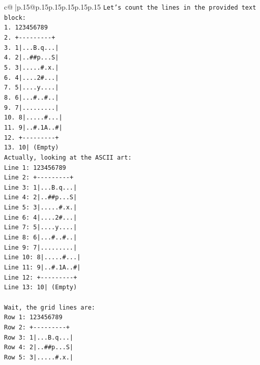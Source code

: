 \documentclass{article}
\begin{document}
{\begin{supertabular}{c@{$\;$}|p{.15\linewidth}@{}p{.15\linewidth}p{.15\linewidth}p{.15\linewidth}p{.15\linewidth}p{.15\linewidth}}
{{{\texttt{Let's count the lines in the provided text block:} \\
\texttt{1. 123456789} \\
\texttt{2. +{-}{-}{-}{-}{-}{-}{-}{-}{-}+} \\
\texttt{3. 1|...B.q...|} \\
\texttt{4. 2|..\#\#p...S|} \\
\texttt{5. 3|.....\#.x.|} \\
\texttt{6. 4|....2\#...|} \\
\texttt{7. 5|....y....|} \\
\texttt{8. 6|...\#..\#..|} \\
\texttt{9. 7|.........|} \\
\texttt{10. 8|.....\#...|} \\
\texttt{11. 9|..\#.1A..\#|} \\
\texttt{12. +{-}{-}{-}{-}{-}{-}{-}{-}{-}+} \\
\texttt{13. 10| (Empty)} \\
\texttt{Actually, looking at the ASCII art:} \\
\texttt{Line 1: 123456789} \\
\texttt{Line 2: +{-}{-}{-}{-}{-}{-}{-}{-}{-}+} \\
\texttt{Line 3: 1|...B.q...|} \\
\texttt{Line 4: 2|..\#\#p...S|} \\
\texttt{Line 5: 3|.....\#.x.|} \\
\texttt{Line 6: 4|....2\#...|} \\
\texttt{Line 7: 5|....y....|} \\
\texttt{Line 8: 6|...\#..\#..|} \\
\texttt{Line 9: 7|.........|} \\
\texttt{Line 10: 8|.....\#...|} \\
\texttt{Line 11: 9|..\#.1A..\#|} \\
\texttt{Line 12: +{-}{-}{-}{-}{-}{-}{-}{-}{-}+} \\
\texttt{Line 13: 10| (Empty)} \\
\\ 
\texttt{Wait, the grid lines are:} \\
\texttt{Row 1: 123456789} \\
\texttt{Row 2: +{-}{-}{-}{-}{-}{-}{-}{-}{-}+} \\
\texttt{Row 3: 1|...B.q...|} \\
\texttt{Row 4: 2|..\#\#p...S|} \\
\texttt{Row 5: 3|.....\#.x.|} \\
}}}
\end{supertabular}}
\end{document}
